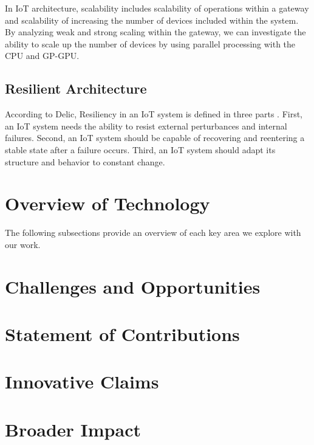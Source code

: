\documentclass[../main.tex]{subfiles}
\begin{document}
In IoT architecture, scalability includes scalability of operations within a gateway and scalability of increasing the number of devices included within the system. By analyzing weak and strong scaling within the gateway, we can investigate the ability to scale up the number of devices by using parallel processing with the CPU and GP-GPU. 

\subsection{Resilient Architecture}

According to Delic, Resiliency in an IoT system is defined in three parts \cite{Delic:2016:RIS:2891279.2822885}. First, an IoT system needs the ability to resist external perturbances and internal failures. Second, an IoT system should be capable of recovering and reentering a stable state after a failure occurs. Third, an IoT system should adapt its structure and behavior to constant change. 

\section{Overview of Technology}
\label{sec:tech-overview}
The following subsections provide an overview of each key area we explore with our work. 

{}

\section{Challenges and Opportunities}
\label{sec:challenge}
{}

\section{Statement of Contributions}
\label{sec:statement}
{}

\section{Innovative Claims}
\label{sec:innovative}
{}

\section{Broader Impact}
\label{sec:impact}
{}
\end{document}
